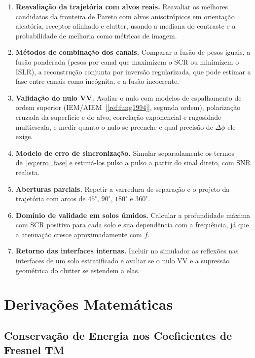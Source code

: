 \documentclass[12pt,a4paper,oneside]{book}
\theoremstyle{remark}
\newcommand{\citar}[1]{[\ref{ref:#1}]}
\theoremstyle{plain}
\theoremstyle{definition}
\begin{document}
\begin{enumerate}
  \item \textbf{Reavaliação da trajetória com alvos reais.} Reavaliar os melhores
  candidatos da fronteira de Pareto com alvos anisotrópicos em orientação
  aleatória, receptor alinhado e clutter, usando a mediana do contraste e a
  probabilidade de melhoria como métricas de imagem.
  \item \textbf{Métodos de combinação dos canais.} Comparar a fusão de pesos iguais,
  a fusão ponderada (pesos por canal que maximizem o SCR ou minimizem o ISLR), a
  reconstrução conjunta por inversão regularizada, que pode estimar a fase entre
  canais como incógnita, e a fusão incoerente.
  \item \textbf{Validação do nulo VV.} Avaliar o nulo com modelos de espalhamento de
  ordem superior (IEM/AIEM~\citar{fung1994}, segunda ordem), polarização cruzada da
  superfície e do alvo, correlação exponencial e rugosidade multiescala, e medir
  quanto o nulo se preenche e qual precisão de $\Delta\phi$ ele exige.
  \item \textbf{Modelo de erro de sincronização.} Simular separadamente os termos
  de~\eqref{eq:erro_fase} e estimá-los pulso a pulso a partir do sinal direto, com
  SNR realista.
  \item \textbf{Aberturas parciais.} Repetir a varredura de separação e o projeto da
  trajetória com arcos de $45^\circ$, $90^\circ$, $180^\circ$ e $360^\circ$.
  \item \textbf{Domínio de validade em solos úmidos.} Calcular a profundidade máxima
  com SCR positivo para cada solo e sua dependência com a frequência, já que a
  atenuação cresce aproximadamente com $f$.
  \item \textbf{Retorno das interfaces internas.} Incluir no simulador as
  reflexões nas interfaces de um solo estratificado e avaliar se o nulo VV e a
  supressão geométrica do clutter se estendem a elas.
\end{enumerate}

\appendix

\chapter{Derivações Matemáticas}
\label{app:math}

\section{Conservação de Energia nos Coeficientes de Fresnel TM}
\label{app:energia_fresnel}
\end{document}
